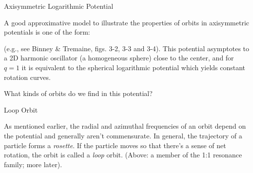 \documentclass[letterpaper,landscape]{slides}
\begin{document}
\begin{slide}
\begin{center}
{\large \color{red} 
                       Axisymmetric Logarithmic Potential   }
\end{center}

A good approximative model to illustrate the properties of orbits in
axisymmetric potentials is one of the form:


(e.g., see Binney \& Tremaine, figs. 3-2, 3-3 and 3-4). This potential
asymptotes to a 2D harmonic oscillator (a homogeneous sphere) close to the
center, and for $q = 1$ it is equivalent to the spherical logarithmic
potential which yields constant rotation curves.

What kinds of orbits do we find in this potential?

\vfill
\end{slide}


\begin{slide}
\begin{center}
{\large \color{red} 
                       Loop Orbit  }
\end{center}

\begin{center}
\vskip 0.0in
\end{center}

As mentioned earlier, the radial and azimuthal frequencies of an orbit
depend on the potential and generally aren't commensurate. In general, the
trajectory of a particle forms a {\em rosette}. If the particle moves so
that there's a sense of net rotation, the orbit is called a {\em loop} orbit.
(Above: a member of the 1:1 resonance family; more later).

\vfill
\end{slide}
\end{document}
